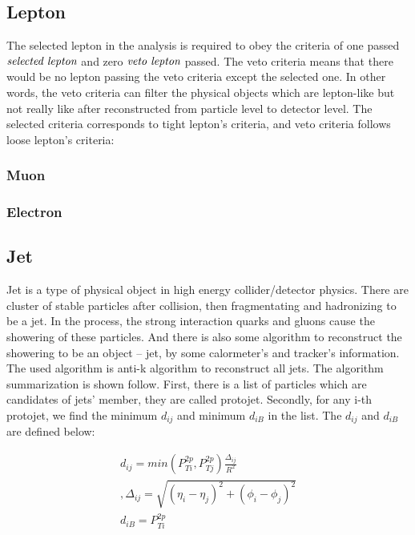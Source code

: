 	\subsection{Lepton}
	\label{ssec:PhysObj_lep}

		The selected lepton in the analysis is required to obey the criteria of one passed $\emph{selected lepton}$ and zero $\emph{veto lepton}$ passed. The veto criteria means that there would be no lepton passing the veto criteria except the selected one. In other words, the veto criteria can filter the physical objects which are lepton-like but not really like after reconstructed from particle level to detector level. The selected criteria corresponds to tight lepton's criteria, and veto criteria follows loose lepton's criteria:

		\subsubsection{Muon}
		\label{sssec:Muon}
			

		\subsubsection{Electron}
		\label{sssec:Electron}

	\subsection{Jet}
	\label{ssec:PhysObj_jet}


		Jet is a type of physical object in high energy collider/detector physics. There are cluster of stable particles after collision, then fragmentating and hadronizing to be a jet. In the process, the strong interaction quarks and gluons cause the showering of these particles. And there is also some algorithm to reconstruct the showering to be an object -- jet, by some calormeter's and tracker's information.
		The used algorithm is anti-k algorithm to reconstruct all jets. The algorithm summarization is shown follow. First, there is a list of particles which are candidates of jets' member, they are called protojet. Secondly, for any i-th protojet, we find the minimum $d_{ij}$ and minimum $d_{iB}$ in the list. The $d_{ij}$ and $d_{iB}$ are defined below:

		\begin{equation}
		\begin{split}
		d_{ij} = min(P_{Ti}^{2p}, P_{Tj}^{2p}) \frac{\Delta_{ij}}{R^2}\\
		, \Delta_{ij} = \sqrt{ (\eta_i - \eta_j)^2 + (\phi_i - \phi_j)^2 }\\
		d_{iB} = P_{Ti}^{2p}
		\end{split}
		\label{eq:jet_reco_algo}
		\end{equation}
		\FloatBarrier

